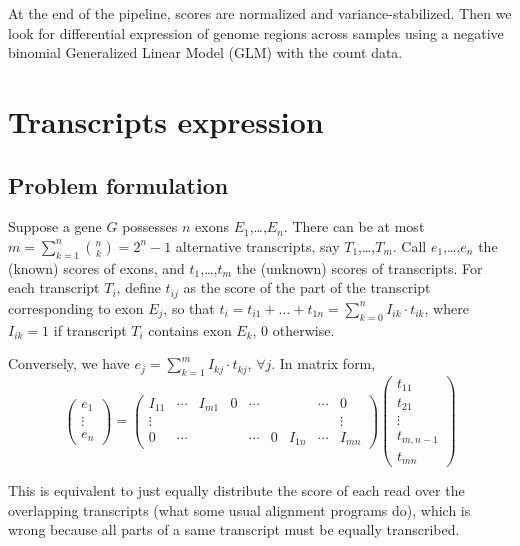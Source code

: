 \documentclass[a4paper,11pt]{article}
\begin{document}
At the end of the pipeline, scores are normalized and variance-stabilized. Then we look for differential expression of genome regions across samples using a negative binomial Generalized Linear Model (GLM) with the count data.

\section{Transcripts expression}

\subsection{Problem formulation}

Suppose a gene $G$ possesses $n$ exons $E_1$,\ldots,$E_n$. There can be at most $m = \sum_{k=1}^n {n \choose k} = 2^{n}-1$ alternative transcripts, say $T_1$,\ldots,$T_{m}$. Call $e_1$,\ldots,$e_n$ the (known) scores of exons, and $t_1$,\ldots,$t_{m}$ the (unknown) scores of transcripts. For each transcript $T_i$, define $t_{ij}$ as the score of the part of the transcript corresponding to exon $E_j$, so that $t_i = t_{i1} + \ldots + t_{1n} = \sum_{k=0}^n I_{ik} \cdot t_{ik}$, where $I_{ik} = 1$ if transcript $T_i$ contains exon $E_k$, 0 otherwise.

Conversely, we have $e_j = \sum_{k=1}^{m} I_{kj} \cdot t_{kj}$, $\forall j$. In matrix form,
$$
\begin{pmatrix}
e_1 \\ \vdots \\ e_n
\end{pmatrix}
=
\begin{pmatrix}
I_{11} & \cdots & I_{m1} & 0 & \cdots &   &      & \cdots & 0 \\
\vdots & &&&&&&& \vdots \\
0      & \cdots &        &   & \cdots & 0 &I_{1n} & \cdots & I_{mn}
\end{pmatrix}
\begin{pmatrix}
t_{11} \\ t_{21} \\ \vdots \\ t_{m,n-1} \\t_{mn}
\end{pmatrix}
$$

This is equivalent to just equally distribute the score of each read over the overlapping transcripts (what some usual alignment programs do), which is wrong because all parts of a same transcript must be equally transcribed. 
\end{document}
